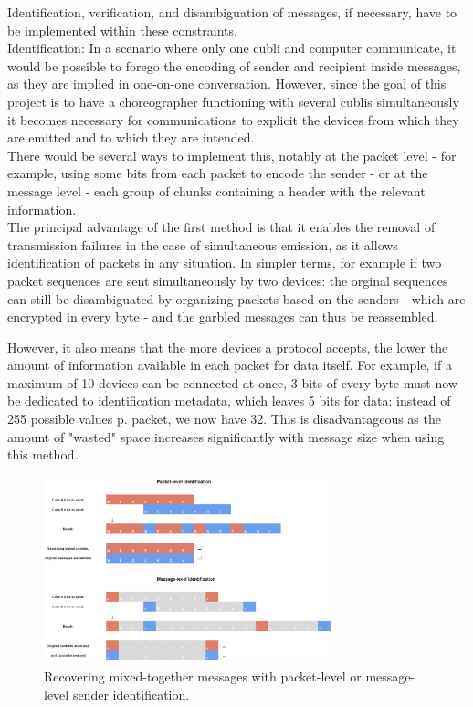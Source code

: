 Identification, verification, and disambiguation of messages, if necessary, have to be implemented within these constraints.\\

Identification: In a scenario where only one cubli and computer communicate, it would be possible to forego the encoding of sender and recipient inside messages, as they are implied in one-on-one conversation. However, since the goal of this project is to have a choreographer functioning with several cublis simultaneously it becomes necessary for communications to explicit the devices from which they are emitted and to which they are intended.\\

There would be several ways to implement this, notably at the packet level - for example, using some bits from each packet to encode the sender - or at the message level - each group of chunks containing a header with the relevant information.\\

The principal advantage of the first method is that it enables the removal of transmission failures in the case of simultaneous emission, as it allows identification of packets in any situation. In simpler terms, for example if two packet sequences are sent simultaneously by two devices: the orginal sequences can still be disambiguated by organizing packets based on the senders - which are encrypted in every byte - and the garbled messages can thus be reassembled.

However, it also means that the more devices a protocol accepts, the lower the amount of information available in each packet for data itself. For example, if a maximum of 10 devices can be connected at once, 3 bits of every byte must now be dedicated to identification metadata, which leaves 5 bits for data: instead of 255 possible values p. packet, we now have 32. This is disadvantageous as the amount of "wasted" space increases significantly with message size when using this method.\\

\begin{figure}[ht]
   \centering
   \includegraphics[width=0.75\textwidth]{img/disambiguation.png}
   \caption{Recovering mixed-together messages with packet-level or message-level sender identification.}
   \label{img:disambiguation}
\end{figure}

